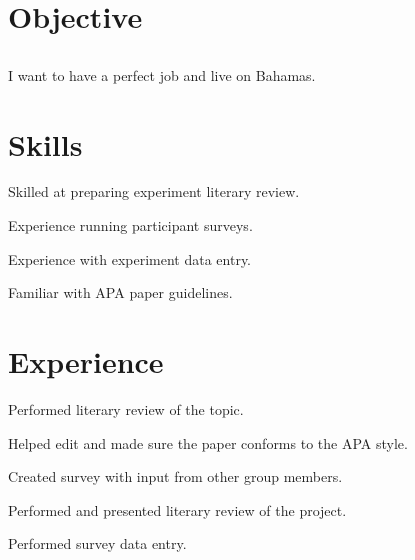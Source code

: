 \documentclass{resume}
\begin{document}
\author{Alexander Ratnikov}
\maketitle

\section{Objective}

\subsection{}

I want to have a perfect job and live on Bahamas.

\section{Skills}

\begin{compactitem}
  \item Skilled at preparing experiment literary review.
  \item Experience running participant surveys.
  \item Experience with experiment data entry.
  \item Familiar with APA paper guidelines.
\end{compactitem}

\section{Experience}

\begin{compactitem}
  \item Performed literary review of the topic.
  \item Helped edit and made sure the paper conforms to the APA style.
\end{compactitem}

\begin{compactitem}
  \item Created survey with input from other group members.
  \item Performed and presented literary review of the project.
  \item Performed survey data entry.
\end{compactitem}
\end{document}
